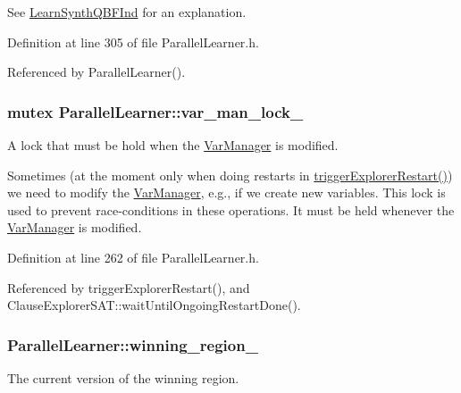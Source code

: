 See \hyperlink{classLearnSynthQBFInd}{Learn\-Synth\-Q\-B\-F\-Ind} for an explanation. 

Definition at line 305 of file Parallel\-Learner.\-h.



Referenced by Parallel\-Learner().

\hypertarget{classParallelLearner_abdd409a5ef29bd4ba6b7213e9d4a067b}{
\subsubsection[{var\-\_\-man\-\_\-lock\-\_\-}]{\setlength{\rightskip}{0pt plus 5cm}mutex Parallel\-Learner\-::var\-\_\-man\-\_\-lock\-\_\-}}\label{classParallelLearner_abdd409a5ef29bd4ba6b7213e9d4a067b}


A lock that must be hold when the \hyperlink{classVarManager}{Var\-Manager} is modified. 

Sometimes (at the moment only when doing restarts in \hyperlink{classParallelLearner_a2b8e4330afb7e99c19d2d7da15c30cc3}{trigger\-Explorer\-Restart()}) we need to modify the \hyperlink{classVarManager}{Var\-Manager}, e.\-g., if we create new variables. This lock is used to prevent race-\/conditions in these operations. It must be held whenever the \hyperlink{classVarManager}{Var\-Manager} is modified. 

Definition at line 262 of file Parallel\-Learner.\-h.



Referenced by trigger\-Explorer\-Restart(), and Clause\-Explorer\-S\-A\-T\-::wait\-Until\-Ongoing\-Restart\-Done().

\hypertarget{classParallelLearner_a7c8383543ff98d7a0356a237756dcdd6}{
\subsubsection[{winning\-\_\-region\-\_\-}]{ Parallel\-Learner\-::winning\-\_\-region\-\_\-}}\label{classParallelLearner_a7c8383543ff98d7a0356a237756dcdd6}


The current version of the winning region. 

